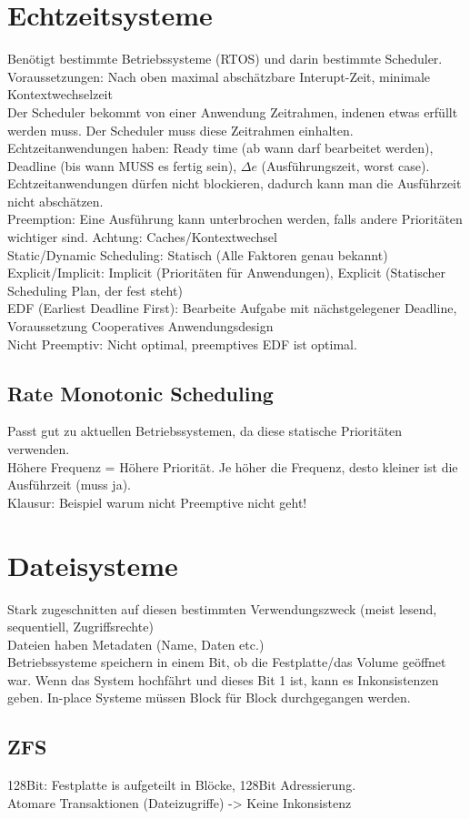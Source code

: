 \documentclass[a4paper]{article}
\begin{document}
\section{Echtzeitsysteme}
Benötigt bestimmte Betriebssysteme (RTOS) und darin bestimmte Scheduler.\\
Voraussetzungen: Nach oben maximal abschätzbare Interupt-Zeit, minimale Kontextwechselzeit\\
Der Scheduler bekommt von einer Anwendung Zeitrahmen, indenen etwas erfüllt werden muss. Der Scheduler muss diese Zeitrahmen einhalten.\\
Echtzeitanwendungen haben: Ready time (ab wann darf bearbeitet werden), Deadline (bis wann MUSS es fertig sein), $\Delta e$ (Ausführungszeit, worst case).\\
Echtzeitanwendungen dürfen nicht blockieren, dadurch kann man die Ausführzeit nicht abschätzen.\\
Preemption: Eine Ausführung kann unterbrochen werden, falls andere Prioritäten wichtiger sind. Achtung: Caches/Kontextwechsel\\
Static/Dynamic Scheduling: Statisch (Alle Faktoren genau bekannt)\\
Explicit/Implicit: Implicit (Prioritäten für Anwendungen), Explicit (Statischer Scheduling Plan, der fest steht)\\
EDF (Earliest Deadline First): Bearbeite Aufgabe mit nächstgelegener Deadline, Voraussetzung Cooperatives Anwendungsdesign\\
Nicht Preemptiv: Nicht optimal, preemptives EDF ist optimal.\\
\subsection*{Rate Monotonic Scheduling}
Passt gut zu aktuellen Betriebssystemen, da diese statische Prioritäten verwenden.\\
Höhere Frequenz = Höhere Priorität. Je höher die Frequenz, desto kleiner ist die Ausführzeit (muss ja).\\
Klausur: Beispiel warum nicht Preemptive nicht geht!
\section{Dateisysteme}
Stark zugeschnitten auf diesen bestimmten Verwendungszweck (meist lesend, sequentiell, Zugriffsrechte)\\
Dateien haben Metadaten (Name, Daten etc.)\\
Betriebssysteme speichern in einem Bit, ob die Festplatte/das Volume geöffnet war. Wenn das System hochfährt und dieses Bit 1 ist, kann es Inkonsistenzen geben. In-place Systeme müssen Block für Block durchgegangen werden.
\subsection{ZFS}
128Bit: Festplatte is aufgeteilt in Blöcke, 128Bit Adressierung.\\
Atomare Transaktionen (Dateizugriffe) -> Keine Inkonsistenz\\
\end{document}
